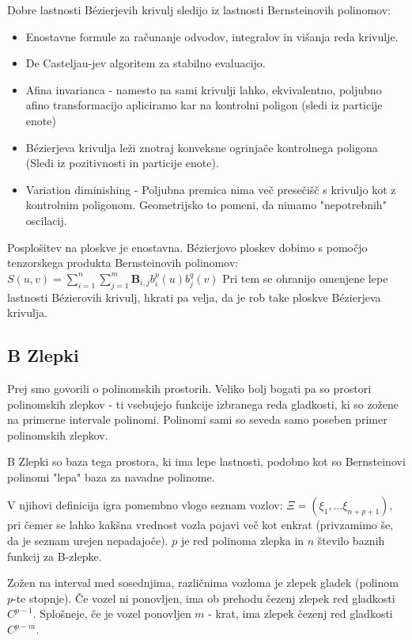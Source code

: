 \documentclass{article}
\begin{document}
Dobre lastnosti Bézierjevih krivulj sledijo iz lastnosti Bernsteinovih polinomov:
\begin{itemize}
\item Enostavne formule za računanje odvodov, integralov in višanja reda krivulje.
\item De Casteljau-jev algoritem za stabilno evaluacijo.
\item Afina invarianca - namesto na sami krivulji lahko, ekvivalentno, poljubno afino transformacijo apliciramo kar na kontrolni poligon (sledi iz particije enote)
\item Bézierjeva krivulja leži znotraj konveksne ogrinjače kontrolnega poligona (Sledi iz pozitivnosti in particije enote).
\item Variation diminishing - Poljubna premica nima več presečišč s krivuljo kot z kontrolnim poligonom. Geometrijsko to pomeni, da nimamo "nepotrebnih" oscilacij.
\end{itemize}

Posplošitev na ploskve je enostavna. Bézierjovo ploskev dobimo s pomočjo tenzorskega produkta Bernsteinovih polinomov:
$S(u, v) = \sum_{i=1}^n \sum_{j=1}^m \textbf{B}_{i,j} b_i^p (u) b_j^q (v)$
Pri tem se ohranijo omenjene lepe lastnosti Bézierovih krivulj, hkrati pa velja, da je rob take ploskve Bézierjeva krivulja. 


\subsection{B Zlepki}

Prej smo govorili o polinomskih prostorih. Veliko bolj bogati pa so prostori polinomskih zlepkov - ti vsebujejo funkcije izbranega reda gladkosti, ki so zožene na primerne intervale polinomi. Polinomi sami so seveda samo poseben primer polinomskih zlepkov.

B Zlepki so baza tega prostora, ki ima lepe lastnosti, podobno kot so Bernsteinovi polinomi "lepa" baza za navadne polinome.

V njihovi definicija igra pomembno vlogo seznam vozlov: $\Xi = ( \xi_1, \dots \xi_{n+p+1} )$, pri čemer se lahko kakšna vrednost vozla pojavi več kot enkrat (privzamimo še, da je seznam urejen nepadajoče). $p$ je red polinoma zlepka in $n$ število baznih funkcij za B-zlepke.

Zožen na interval med sosednjima, različnima vozloma je zlepek gladek (polinom $p$-te stopnje). Če vozel ni ponovljen, ima ob prehodu čezenj zlepek red gladkosti $C^{p-1}$. Splošneje, če je vozel ponovljen $m$ - krat, ima zlepek čezenj red gladkosti $C^{p-m}$. 
\end{document}
